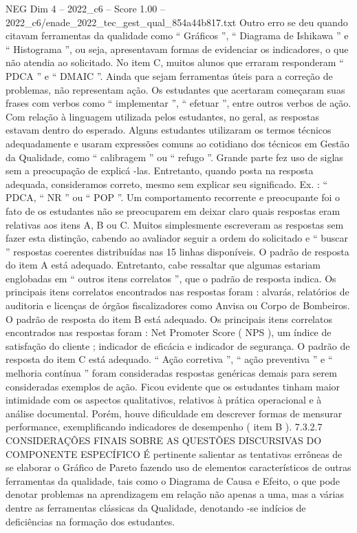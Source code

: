 \begin{textsample}{NEG Dim 4 – 2022\_c6 – Score 1.00 – 2022\_c6/enade\_2022\_tec\_gest\_qual\_854a44b817.txt}
Outro erro se deu quando citavam ferramentas da qualidade como “ Gráficos ”, “ Diagrama de Ishikawa ” e “ Histograma ”, ou seja, apresentavam formas de evidenciar os indicadores, o que não atendia ao solicitado.
No item C, muitos alunos que erraram responderam “ PDCA ” e “ DMAIC ”.
Ainda que sejam ferramentas úteis para a correção de problemas, não representam ação.
Os estudantes que acertaram começaram suas frases com verbos como “ implementar ”, “ efetuar ”, entre outros verbos de ação.
Com relação à linguagem utilizada pelos estudantes, no geral, as respostas estavam dentro do esperado.
Alguns estudantes utilizaram os termos técnicos adequadamente e usaram expressões comuns ao cotidiano dos técnicos em Gestão da Qualidade, como “ calibragem ” ou “ refugo ”.
Grande parte fez uso de siglas sem a preocupação de explicá -las.
Entretanto, quando posta na resposta adequada, consideramos correto, mesmo sem explicar seu significado.
Ex. : “ PDCA, “ NR ” ou “ POP ”.
Um comportamento recorrente e preocupante foi o fato de os estudantes não se preocuparem em deixar claro quais respostas eram relativas aos itens A, B ou C.
Muitos simplesmente escreveram as respostas sem fazer esta distinção, cabendo ao avaliador seguir a ordem do solicitado e “ buscar ” respostas coerentes distribuídas nas 15 linhas disponíveis.
O padrão de resposta do item A está adequado.
Entretanto, cabe ressaltar que algumas estariam englobadas em “ outros itens correlatos ”, que o padrão de resposta indica.
Os principais itens correlatos encontrados nas respostas foram : alvarás, relatórios de auditoria e licenças de órgãos fiscalizadores como Anvisa ou Corpo de Bombeiros.
O padrão de resposta do item B está adequado.
Os principais itens correlatos encontrados nas respostas foram : Net Promoter Score ( NPS ), um índice de satisfação do cliente ; indicador de eficácia e indicador de segurança.
O padrão de resposta do item C está adequado. “ Ação corretiva ”, “ ação preventiva ” e “ melhoria contínua ” foram consideradas respostas genéricas demais para serem consideradas exemplos de ação.
Ficou evidente que os estudantes tinham maior intimidade com os aspectos qualitativos, relativos à prática operacional e à análise documental.
Porém, houve dificuldade em descrever formas de mensurar performance, exemplificando indicadores de desempenho ( item B ). 7.3.2.7 CONSIDERAÇÕES FINAIS SOBRE AS QUESTÕES DISCURSIVAS DO COMPONENTE ESPECÍFICO É pertinente salientar as tentativas errôneas de se elaborar o Gráfico de Pareto fazendo uso de elementos característicos de outras ferramentas da qualidade, tais como o Diagrama de Causa e Efeito, o que pode denotar problemas na aprendizagem em relação não apenas a uma, mas a várias dentre as ferramentas clássicas da Qualidade, denotando -se indícios de deficiências na formação dos estudantes.

\end{textsample}
